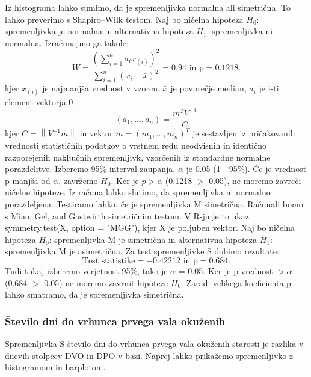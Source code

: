 \documentclass[a4paper,11pt]{article}
\begin{document}
Iz histograma lahko sumimo, da je spremenljivka normalna ali simetrična. To lahko preverimo s Shapiro–Wilk testom. Naj bo ničelna hipoteza \(H_0\): spremenljivka je normalna in alternativna hipoteza \(H_1\): spremenljivka ni normalna. Izračunajmo ga takole:
\[W = \frac{(\sum_{i = 1}^{n}a_i x_{(i)})^2}{\sum_{i = 1}^{n}(x_i - \overset{\_}{x})^2} = 0.94 \text{ in p} = 0.1218.\]
kjer \(x_{(i)}\) je najmanjša vrednost v vzorcu, \(\overset{\_}{x}\) je povprečje median, \(a_i\) je i-ti element vektorja 0   
\[(a_1,...,a_n) = \frac{m^T V^{-1}}{C}\]
kjer \( C = \left\| V^{-1}m \right\|\) in vektor \(m = (m_1,...,m_n)^T\) je sestavljen iz pričakovanih vrednosti statističnih podatkov o vrstnem redu neodvisnih in identično razporejenih naključnih spremenljivk, vzorčenih iz standardne normalne porazdelitve.
Izberemo 95\% interval zaupanja. \(\alpha\) je 0.05 (1 - 95\%). Če je vrednost p manjša od \(\alpha\), zavržemo \(H_0\). Ker je \(p > \alpha\) (0.1218 \(>\) 0.05), ne moremo zavreči ničelne hipoteze. Iz računa lahko slutimo, da spremenljivka ni normalno porazdeljena. Testiramo lahko, če je spremenljivka M simetrična. Računali bomo s Miao, Gel, and Gastwirth simetričnim testom. V R-ju je to ukaz symmetry.test(X, option = "MGG")\cite{lawstat}, kjer X je poljuben vektor. Naj bo ničelna hipoteza \(H_0\): spremenljivka M je simetrična in alternativna hipoteza \(H_1\): spremenljivka M je asimetrična. Za test spremenljivke S dobimo rezultate:
\[\text{Test statistike} = -0.42212 \text{ in p} = 0.684.\]
Tudi tukaj izberemo verjetnost 95\%, tako je \(\alpha\) = 0.05. Ker je p vrednost \(> \alpha\) (0.684 \(>\) 0.05) ne moremo zavrnit hipoteze \(H_0\). Zaradi velikega koeficienta p lahko smatramo, da je spremenljivka simetrična.

\subsubsection{Število dni do vrhunca prvega vala okuženih}
Spremenljivka S število dni do vrhunca prvega vala okuženih starosti je razlika v dnevih stolpcev DVO in DPO v bazi. Naprej lahko prikažemo spremenljivko z histogramom in barplotom.
\end{document}
